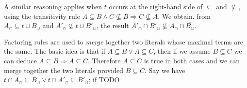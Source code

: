 \documentclass{article}
\newcommand{\compl}[1]{\ensuremath{\overline{#1}}}
\begin{document}
A similar reasoning applies when $t$ occurs at the right-hand side of
$\subseteq$ and $\not\subseteq$, using the transitivity rule
$A \subseteq B \land C \not\subseteq B \Rightarrow C \not\subseteq A$. We
obtain, from $A_\cap \subseteq t\cup B_\cup$ and
$A'_\cap \not\subseteq t\cup B'_\cup$, the result
$A'_\cap \cap \compl{B'_\cup} \not\subseteq A_\cap \cap \compl{B_\cup}$.

Factoring rules are used to \emph{merge} together two literals whose maximal
terms are the same. The basic idea is that if $A \subseteq B
\lor A \subseteq C$, then if we assume $B\subseteq C$ we can deduce
$A \subseteq B \Rightarrow A \subseteq C$. Therefore $A\subseteq C$ is true
in both cases and we can merge together the two literals provided $B\subseteq C$.
Say we have
$t \cap A_\cap \subseteq B_\cup \lor t \cap A'_\cap \subseteq B'_\cup$; if
TODO %
\end{document}
